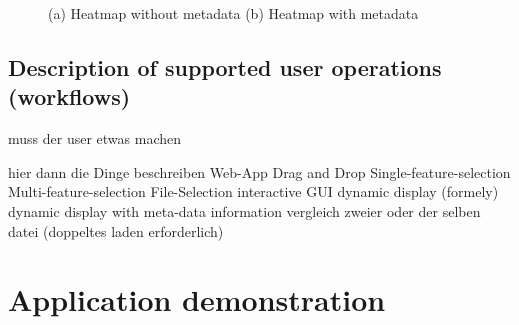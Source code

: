 \documentclass[runningheads]{llncs}
\begin{document}
\begin{itemize}
    \begin{figure}
        \centering
        \caption{(a) Heatmap without metadata (b) Heatmap with metadata}
        \label{fig:metdata}
    \end{figure}
\end{itemize}



\subsection{Description of supported user operations (workflows)}
muss der user etwas machen



hier dann die Dinge beschreiben
Web-App
Drag and Drop
Single-feature-selection
Multi-feature-selection
File-Selection
interactive GUI
dynamic display
(formely) dynamic display with meta-data information
vergleich zweier oder der selben datei (doppeltes laden erforderlich)








\section{Application demonstration}
\end{document}
